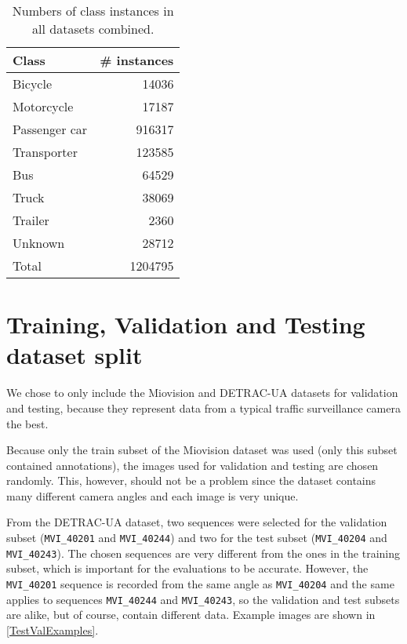 \begin{table}[h]
\centering
\begin{tabular}{|l|r|}
    \hline
    Class         & \# instances \\
    \hline
    Bicycle       &  \num{14036} \\
    Motorcycle    &  \num{17187} \\
    Passenger car & \num{916317} \\
    Transporter   & \num{123585} \\
    Bus           &  \num{64529} \\
    Truck         &  \num{38069} \\
    Trailer       &   \num{2360} \\
    Unknown       &  \num{28712} \\
    \hline
    \hline
    Total         & \num{1204795} \\
    \hline
\end{tabular}
\caption{Numbers of class instances in all datasets combined.}
\label{DatasetsCounts}
\end{table}


\section{Training, Validation and Testing dataset split}

We chose to only include the Miovision and DETRAC-UA datasets for validation and
testing, because they represent data from a typical traffic surveillance camera
the best. 

Because only the train subset of the Miovision dataset was used (only this
subset contained annotations), the images used for validation and testing are
chosen randomly. This, however, should not be a problem since the dataset
contains many different camera angles and each image is very unique.

From the DETRAC-UA dataset, two sequences were selected for the validation
subset (\texttt{MVI\_40201} and \texttt{MVI\_40244}) and two for the test subset
(\texttt{MVI\_40204} and \texttt{MVI\_40243}). The chosen sequences are very
different from the ones in the training subset, which is important for the
evaluations to be accurate. However, the \texttt{MVI\_40201} sequence is
recorded from the same angle as \texttt{MVI\_40204} and the same applies to
sequences \texttt{MVI\_40244} and \texttt{MVI\_40243}, so the validation and
test subsets are alike, but of course, contain different data. Example images
are shown in \autoref{TestValExamples}.

